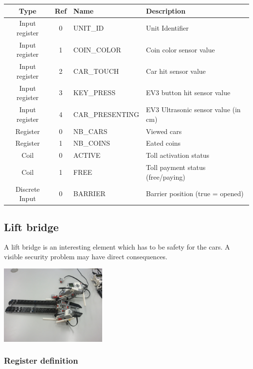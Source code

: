 \documentclass[10pt,a4paper]{article}
\begin{document}
			\begin{tabular}{|c|c|l|l|}
			\hline 
			\textbf{Type} & \textbf{Ref} & \textbf{Name} & \textbf{Description} \\ 
			\hline 
			Input register & 0 & UNIT\_ID & Unit Identifier\\ 
			\hline 
			Input register & 1 & COIN\_COLOR & Coin color sensor value\\ 
			\hline 
			Input register & 2 & CAR\_TOUCH & Car hit sensor value\\ 
			\hline 
			Input register & 3 & KEY\_PRESS & EV3 button hit sensor value\\ 
			\hline 
			Input register & 4 & CAR\_PRESENTING & EV3 Ultrasonic sensor value (in cm)\\ 
			\hline 
			Register & 0 & NB\_CARS & Viewed cars\\ 
			\hline 
			Register & 1 & NB\_COINS & Eated coins\\ 
			\hline 
			Coil & 0 & ACTIVE & Toll activation status \\ 
			\hline 
			Coil & 1 & FREE & Toll payment status (free/paying) \\ 
			\hline 
			Discrete Input & 0 & BARRIER & Barrier position (true = opened) \\ 
			\hline 
			\end{tabular} 
		
	\subsection{Lift bridge}
	A lift bridge is an interesting element which has to be safety for the cars. A visible security problem may have direct consequences.
	
	\begin{center}
	\includegraphics[height=4cm]{rsrc/Bridge_02.jpg}
	\end{center}
	
	    \subsubsection{Register definition}
	
\end{document}
